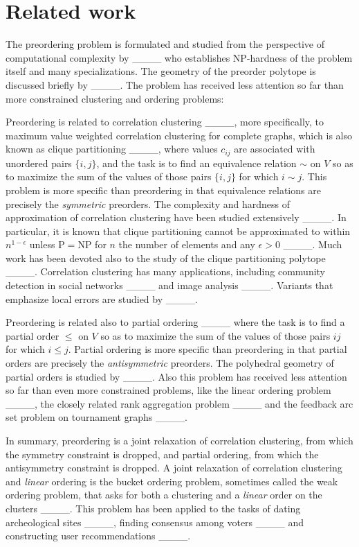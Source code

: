 \section{Related work}
\label{sec:related-work}

The preordering problem is formulated and studied from the perspective of computational complexity by ____ who establishes \textsc{NP}-hardness of the problem itself and many specializations.
The geometry of the preorder polytope is discussed briefly by ____.
The problem has received less attention so far than more constrained clustering and ordering problems:

Preordering is related to correlation clustering ____, more specifically, to maximum value weighted correlation clustering for complete graphs, which is also known as clique partitioning ____, where values $c_{ij}$ are associated with unordered pairs $\{i,j\}$, and the task is to find an equivalence relation $\sim$ on $V$ so as to maximize the sum of the values of those pairs $\{i,j\}$ for which $i \sim j$.
This problem is more specific than preordering in that equivalence relations are precisely the \emph{symmetric} preorders. 
The complexity and hardness of approximation of correlation clustering have been studied extensively ____.
In particular, it is known that clique partitioning cannot be approximated to within $n^{1-\epsilon}$ unless \textsc{P}$=$\textsc{NP} for $n$ the number of elements and any $\epsilon > 0$ ____.
Much work has been devoted also to the study of the clique partitioning polytope
____.
Correlation clustering has many applications, including community detection in social networks ____ and image analysis ____.
Variants that emphasize local errors are studied by ____.

Preordering is related also to partial ordering ____ where the task is to find a partial order $\leq$ on $V$ so as to maximize the sum of the values of those pairs $ij$ for which $i \leq j$.
Partial ordering is more specific than preordering in that partial orders are precisely the \emph{antisymmetric} preorders.
The polyhedral geometry of partial orders is studied by ____.
Also this problem has received less attention so far than even more constrained problems, like the linear ordering problem ____, the closely related rank aggregation problem ____ and the feedback arc set problem on tournament graphs ____.

In summary, preordering is a joint relaxation of correlation clustering, from which the symmetry constraint is dropped, and partial ordering, from which the antisymmetry constraint is dropped.
A joint relaxation of correlation clustering and \emph{linear} ordering is the bucket ordering problem, sometimes called the weak ordering problem, that asks for both a clustering and a \emph{linear} order on the clusters ____.
This problem has been applied to the tasks of dating archeological sites ____, finding consensus among voters ____ and constructing user recommendations ____.
